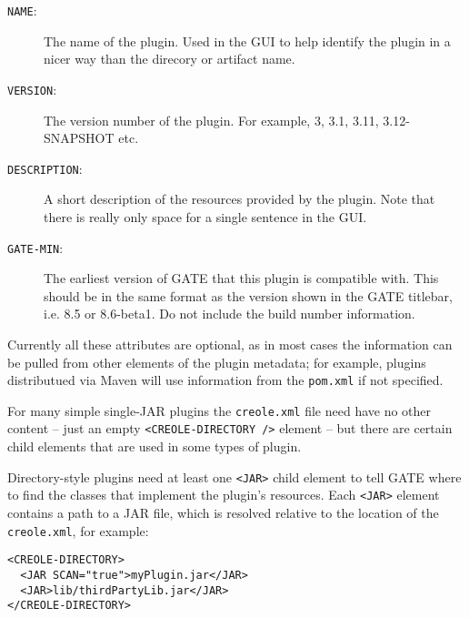 \begin{description}
\item[{\tt NAME}:] The name of the plugin. Used in the GUI to help identify the
plugin in a nicer way than the direcory or artifact name.
\item[{\tt VERSION}:] The version number of the plugin. For example, 3, 3.1,
3.11, 3.12-SNAPSHOT etc.
\item[{\tt DESCRIPTION}:] A short description of the resources provided by the plugin.
Note that there is really only space for a single sentence in the GUI.
\item[{\tt GATE-MIN}:] The  earliest version of GATE that this plugin is compatible
with. This should be in the same format as the version shown in the GATE titlebar, i.e.
8.5 or 8.6-beta1. Do not include the build number information.
\end{description}

Currently all these attributes are optional, as in most cases the information can
be pulled from other elements of the plugin metadata; for example, plugins distributued
via Maven will use information from the \verb|pom.xml| if not specified.

For many simple single-JAR plugins the {\tt creole.xml} file need have no other
content -- just an empty \verb|<CREOLE-DIRECTORY />| element -- but there are
certain child elements that are used in some types of plugin.

Directory-style plugins need at least one \verb|<JAR>| child element to tell
GATE where to find the classes that implement the plugin's resources.  Each
\verb|<JAR>| element contains a path to a JAR file, which is resolved relative
to the location of the {\tt creole.xml}, for example:
\begin{small}\begin{verbatim}
<CREOLE-DIRECTORY>
  <JAR SCAN="true">myPlugin.jar</JAR>
  <JAR>lib/thirdPartyLib.jar</JAR>
</CREOLE-DIRECTORY>
\end{verbatim}\end{small}


